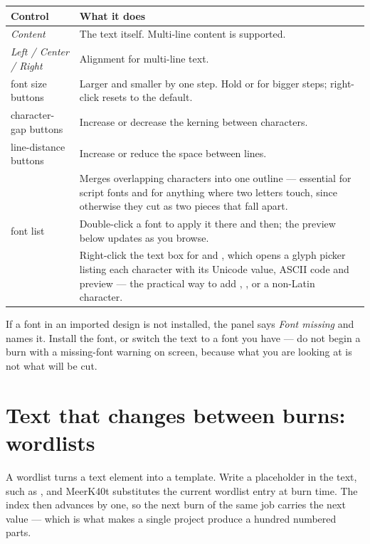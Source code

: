 \begin{center}\small
\begin{tabular}{@{}L{3.4cm}L{10.8cm}@{}}
\toprule
\textbf{Control} & \textbf{What it does} \\
\midrule
\emph{Content} & The text itself. Multi-line content is supported. \\
\emph{Left / Center / Right} & Alignment for multi-line text. \\
font size buttons & Larger and smaller by one step. Hold  or
 for bigger steps; right-click resets to the default. \\
character-gap buttons & Increase or decrease the kerning between characters. \\
line-distance buttons & Increase or reduce the space between lines. \\
 & Merges overlapping characters into one outline --- essential for
script fonts and for anything where two letters touch, since otherwise they cut
as two pieces that fall apart. \\
font list & Double-click a font to apply it there and then; the preview below
updates as you browse. \\
 & Right-click the text box for  and
, which opens a glyph picker listing each character with its
Unicode value, ASCII code and preview --- the practical way to add
\textdegree{}, \textmu{}, \texteuro{} or a non-Latin character. \\
\bottomrule
\end{tabular}
\end{center}

\noindent If a font in an imported design is not installed, the panel says
\emph{Font missing} and names it. Install the font, or switch the text to a font
you have --- do not begin a burn with a missing-font warning on screen, because
what you are looking at is not what will be cut.

\section{Text that changes between burns: wordlists}

A wordlist turns a text element into a template. Write a placeholder in the text,
such as , and MeerK40t substitutes the current wordlist entry at
burn time. The index then advances by one, so the next burn of the same job
carries the next value --- which is what makes a single project produce a hundred
numbered parts.

